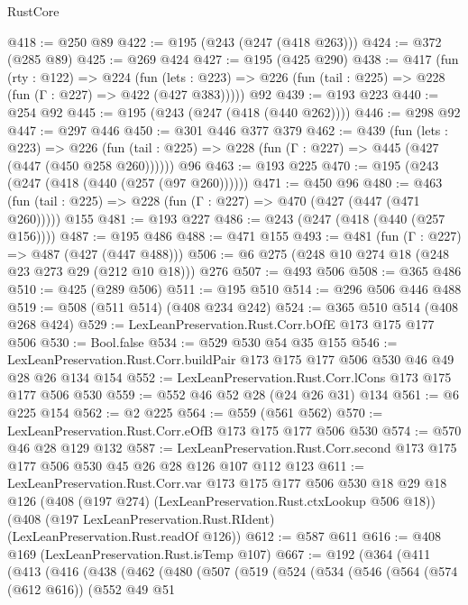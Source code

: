 \begin{lexlean}{RustCore}
\begin{coremodule}
{\begin{coremodule}
{{{{{@418 := @250 @89
@422 := @195 (@243 (@247 (@418 @263)))
@424 := @372 (@285 @89)
@425 := @269 @424
@427 := @195 (@425 @290)
@438 := @417
    (fun (rty : @122) =>
    @224
      (fun (lets : @223) => @226 (fun (tail : @225) => @228 (fun (Γ : @227) => @422 (@427 @383)))))
    @92
@439 := @193 @223
@440 := @254 @92
@445 := @195 (@243 (@247 (@418 (@440 @262))))
@446 := @298 @92
@447 := @297 @446
@450 := @301 @446 @377 @379
@462 := @439
    (fun (lets : @223) =>
    @226 (fun (tail : @225) => @228 (fun (Γ : @227) => @445 (@427 (@447 (@450 @258 @260))))))
    @96
@463 := @193 @225
@470 := @195 (@243 (@247 (@418 (@440 (@257 (@97 @260))))))
@471 := @450 @96
@480 := @463 (fun (tail : @225) => @228 (fun (Γ : @227) => @470 (@427 (@447 (@471 @260))))) @155
@481 := @193 @227
@486 := @243 (@247 (@418 (@440 (@257 @156))))
@487 := @195 @486
@488 := @471 @155
@493 := @481 (fun (Γ : @227) => @487 (@427 (@447 @488)))
@506 := @6 @275 (@248 @10 @274 @18 (@248 @23 @273 @29 (@212 @10 @18))) @276
@507 := @493 @506
@508 := @365 @486
@510 := @425 (@289 @506)
@511 := @195 @510
@514 := @296 @506 @446 @488
@519 := @508 (@511 @514) (@408 @234 @242)
@524 := @365 @510 @514 (@408 @268 @424)
@529 := LexLeanPreservation.Rust.Corr.bOfE @173 @175 @177 @506
@530 := Bool.false
@534 := @529 @530 @54 @35 @155
@546 := LexLeanPreservation.Rust.Corr.buildPair @173 @175 @177 @506 @530 @46 @49 @28 @26 @134 @154
@552 := LexLeanPreservation.Rust.Corr.lCons @173 @175 @177 @506 @530
@559 := @552 @46 @52 @28 (@24 @26 @31) @134
@561 := @6 @225 @154
@562 := @2 @225
@564 := @559 (@561 @562)
@570 := LexLeanPreservation.Rust.Corr.eOfB @173 @175 @177 @506 @530
@574 := @570 @46 @28 @129 @132
@587 := LexLeanPreservation.Rust.Corr.second
    @173
    @175
    @177
    @506
    @530
    @45
    @26
    @28
    @126
    @107
    @112
    @123
@611 := LexLeanPreservation.Rust.Corr.var
    @173
    @175
    @177
    @506
    @530
    @18
    @29
    @18
    @126
    (@408 (@197 @274) (LexLeanPreservation.Rust.ctxLookup @506 @18))
    (@408 (@197 LexLeanPreservation.Rust.RIdent) (LexLeanPreservation.Rust.readOf @126))
@612 := @587 @611
@616 := @408 @169 (LexLeanPreservation.Rust.isTemp @107)
@667 := @192
    (@364
      (@411
        (@413
          (@416
            (@438
              (@462
                (@480
                  (@507
                    (@519
                      (@524
                        (@534
                          (@546
                            (@564
                              (@574 (@612 @616))
                              (@552
                                @49
                                @51
}}}}}
\end{coremodule}}
\end{coremodule}
\end{lexlean}
